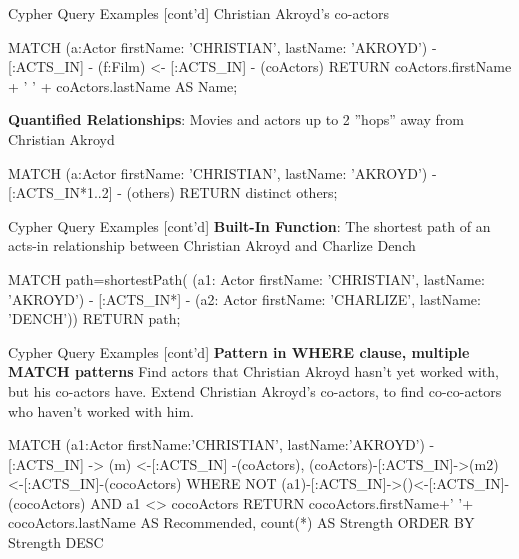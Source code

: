 \documentclass[ignorenonframetext,xcolor=x11names]{beamer}
\begin{document}
\begin{frame}[label=withcode,fragile]{Cypher Query Examples \small [cont'd]}
Christian Akroyd's co-actors
\footnotesize
\begin{cyphercode}
MATCH (a:Actor {firstName: 'CHRISTIAN', 
                lastName: 'AKROYD'}) 
      - [:ACTS_IN] 
      - (f:Film) 
     <- [:ACTS_IN] 
      - (coActors) 
RETURN coActors.firstName + ' ' + 
       coActors.lastName AS Name;
\end{cyphercode}
\normalsize
\textbf{Quantified Relationships}: Movies and actors up to 2 ''hops'' away from Christian Akroyd
\footnotesize
\begin{cyphercode}
MATCH (a:Actor {firstName: 'CHRISTIAN', 
                lastName: 'AKROYD'})
      - [:ACTS_IN*1..2] 
      - (others) 
RETURN distinct others;
\end{cyphercode}
\end{frame}

\begin{frame}[label=withcode,fragile]{Cypher Query Examples \small [cont'd]}
\textbf{Built-In Function}: The shortest path of an acts-in relationship between Christian Akroyd and Charlize Dench
\footnotesize
\begin{cyphercode}
MATCH path=shortestPath( 
  (a1: Actor {firstName: 'CHRISTIAN', 
              lastName: 'AKROYD'}) 
  - [:ACTS_IN*] 
  - (a2: Actor {firstName: 'CHARLIZE', 
                lastName: 'DENCH'})) 
RETURN path;
\end{cyphercode}
\end{frame}

\begin{frame}[label=withcode,fragile]{Cypher Query Examples \small [cont'd]}
\textbf{Pattern in WHERE clause, multiple MATCH patterns} Find actors that Christian Akroyd hasn't yet worked with, but his co-actors have. Extend Christian Akroyd's co-actors, to find co-co-actors who haven't worked with him.
\footnotesize
\begin{cyphercode}
MATCH (a1:Actor {firstName:'CHRISTIAN', 
                 lastName:'AKROYD'})
      - [:ACTS_IN] -> (m) <-[:ACTS_IN] -(coActors),
  (coActors)-[:ACTS_IN]->(m2)<-[:ACTS_IN]-(cocoActors)
WHERE NOT (a1)-[:ACTS_IN]->()<-[:ACTS_IN]-(cocoActors) 
      AND a1 <> cocoActors
RETURN cocoActors.firstName+' '+
       cocoActors.lastName AS Recommended, 
       count(*) AS Strength 
ORDER BY Strength DESC
\end{cyphercode}
\end{frame}
\end{document}
